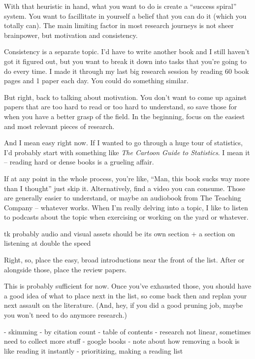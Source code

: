 With that heuristic in hand, what you want to do is create a ``success spiral''
system. You want to facillitate in yourself a belief that you can do it (which
you totally can). The main limiting factor in most research journeys is not
sheer brainpower, but motivation and consistency.

Consistency is a separate topic. I'd have to write another book and I still
haven't got it figured out, but you want to break it down into tasks that you're
going to do every time. I made it through my last big research session by
reading 60 book pages and 1 paper each day. You could do something similar.

But right, back to talking about motivation. You don't want to come up against
papers that are too hard to read or too hard to understand, so save those for
when you have a better grasp of the field. In the beginning, focus on the
easiest and most relevant pieces of research.

And I mean easy right now. If I wanted to go through a huge tour of statistics,
I'd probably start with something like \textit{The Cartoon Guide to
  Statistics}. I mean it -- reading hard or dense books is a grueling affair.

If at any point in the whole process, you're like, ``Man, this book sucks way
more than I thought'' just skip it. Alternatively, find a video you can
consume. Those are generally easier to understand, or maybe an audiobook from
The Teaching Company -- whatever works. When I'm really delving into a topic, I
like to listen to podcasts about the topic when exercising or working on the
yard or whatever.

tk probably audio and visual assets should be its own section + a section on
listening at double the speed

Right, so, place the easy, broad introductions near the front of the list. After
or alongside those, place the review papers.

This is probably sufficient for now. Once you've exhausted those, you should
have a good idea of what to place next in the list, so come back then and replan
your next assault on the literature. (And, hey, if you did a good pruning job,
maybe you won't need to do anymore research.)

- skimming
- by citation count
- table of contents
- research not linear, sometimes need to collect more stuff
- google books
- note about how removing a book is like reading it instantly
- prioritizing, making a reading list

